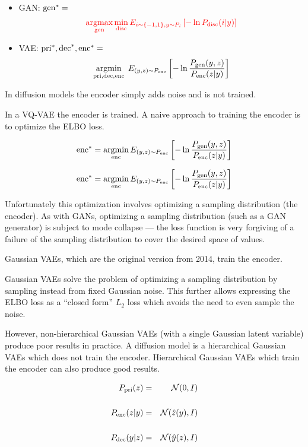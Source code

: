 {\begin{itemize}
\vfill
\item GAN: $\mathrm{gen}^* =$
$${\color{red} \operatorname*{argmax}_{\mathrm{gen}} \min_{\mathrm{disc}} E_{i \sim \{-1,1\}, y \sim P_i}\left[-\ln P_{\mathrm{disc}}(i|y)\right]}$$

\vfill
\item VAE: $\mathrm{pri}^*,\mathrm{dec}^*,\mathrm{enc}^* =$
{\color{red} $$\operatorname*{argmin}_{\mathrm{pri},\mathrm{dec},\mathrm{enc}}\;E_{(y,z) \sim P_{\mathrm{enc}}}\left[ - \ln \frac{P_{\mathrm{gen}}(y,z)}{P_{\mathrm{enc}}(z|y)}\right]$$}
\end{itemize}


In diffusion models the encoder simply adds noise and is not trained.

\vfill
In a VQ-VAE the encoder is trained. A naive approach to training the encoder is to optimize the ELBO loss.

{\color{red} $$\mathrm{enc}^* = \operatorname*{argmin}_{\mathrm{enc}} E_{(y,z) \sim P_{\mathrm{enc}}}\left[ - \ln \frac{P_{\mathrm{gen}}(y,z)}{P_{\mathrm{enc}}(z|y)}\right]$$}


{\color{red} $$\mathrm{enc}^* = \operatorname*{argmin}_{\mathrm{enc}} E_{(y,z) \sim P_{\mathrm{enc}}}\left[ - \ln \frac{P_{\mathrm{gen}}(y,z)}{P_{\mathrm{enc}}(z|y)}\right]$$}

\vfill
Unfortunately this optimization involves optimizing a sampling distribution (the encoder).  As with GANs,
optimizing a sampling distribution (such as a GAN generator) is subject to mode collapse --- the loss
function is very forgiving of a failure of the sampling distribution to cover the desired space of
values.


Gaussian VAEs, which are the original version from 2014, train the encoder.

\vfill
Gaussian VAEs solve the problem of optimizing a sampling distribution
by sampling instead from fixed Gaussian noise.  This further allows expressing the ELBO loss as a ``closed form'' $L_2$ loss
which avoids the need to even sample the noise.

\vfill
However, non-hierarchical Gaussian VAEs (with a single Gaussian latent variable) produce poor results in practice.  A diffusion model
is a hierarchical Gaussian VAEs which does not train the encoder. Hierarchical Gaussian VAEs which train the encoder can also
produce good results.


\begin{eqnarray*}
P_{\mathrm{pri}}(z) & = & {\cal N}(0,I) \\
\\
P_{\mathrm{enc}}(z|y) & = & {\cal N}(\hat{z}(y),I) \\
\\
P_{\mathrm{dec}}(y|z) & = & {\cal N}(\hat{y}(z),I)
\end{eqnarray*}

}
